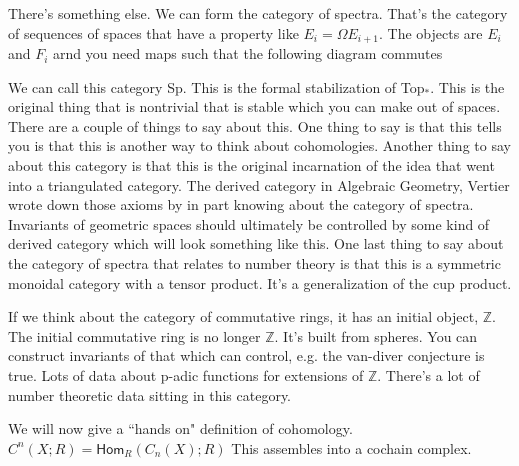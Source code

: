 \documentclass[12pt]{article}
\theoremstyle{definition}
\begin{document}
	There's something else. We can form the category of spectra. That's the category of sequences of spaces that have a property like $E_i=\Omega E_{i+1}$. The objects are $E_i$ and $F_i$ arnd you need maps such that the following diagram commutes
	\begin{center}
	\end{center}
	We can call this category \textsf{Sp}. This is the formal stabilization of \textsf{Top}$_\ast$. This is the original thing that is nontrivial that is stable which you can make out of spaces. There are a couple of things to say about this. One thing to say is that this tells you is that this is another way to think about cohomologies. Another thing to say about this category is that this is the original incarnation of the idea that went into a triangulated category. The derived category in Algebraic Geometry, Vertier wrote down those axioms by in part knowing about the category of spectra. Invariants of geometric spaces should ultimately be controlled by some kind of derived category which will look something like this. One last thing to say about the category of spectra that relates to number theory is that this is a symmetric monoidal category with a tensor product. It's a generalization of the cup product. 
	
	If we think about the category of commutative rings, it has an initial object, $\mathbb{Z}$. The initial commutative ring is no longer $\mathbb{Z}$. It's built from spheres. You can construct invariants of that which can control, e.g. the van-diver conjecture is true. Lots of data about p-adic functions for extensions of $\mathbb{Z}$. There's a lot of number theoretic data sitting in this category. 
	
	We will now give a ``hands on" definition of cohomology. $C^n(X;R)=\mathsf{Hom}_R(C_n(X);R)$ This assembles into a cochain complex. 
	
\end{document}
